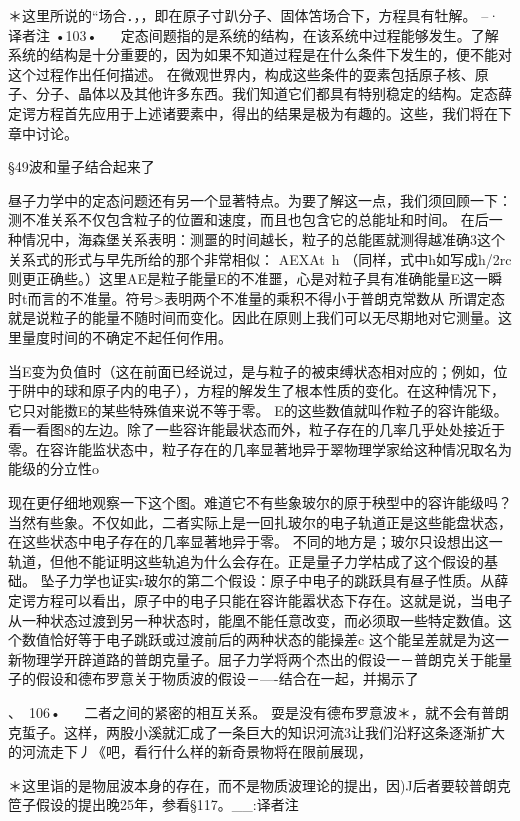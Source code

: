 ＊这里所说的“场合．，，即在原子寸趴分子、固体笘场合下，方程具有牡解。
--·译者注
•103•
  
定态间题指的是系统的结构，在该系统中过程能够发生。了解系统的结构是十分重要的，因为如果不知道过程是在什么条件下发生的，便不能对这个过程作出任何描述。
在微观世界内，构成这些条件的耍素包括原子核、原子、分子、晶体以及其他许多东西。我们知道它们都具有特别稳定的结构。定态薛定谔方程首先应用于上述诸要素中，得出的结果是极为有趣的。这些，我们将在下章中讨论。

§49波和量子结合起来了

昼子力学中的定态问题还有另一个显著特点。为要了解这一点，我们须回顾一下：测不准关系不仅包含粒子的位置和速度，而且也包含它的总能址和时间。
在后一种情况中，海森堡关系表明：测噩的时间越长，粒子的总能匿就测得越准确3这个关系式的形式与早先所给的那个非常相似：
AEXAt~h
（同样，式中h如写成h/2rc则更正确些。）这里AE是粒子能量E的不准噩，心是对粒子具有准确能量E这一瞬时t而言的不准量。符号>表明两个不准量的乘积不得小于普朗克常数从
所谓定态就是说粒子的能量不随时间而变化。因此在原则上我们可以无尽期地对它测量。这里量度时间的不确定不起任何作用。

当E变为负值时（这在前面已经说过，是与粒子的被束缚状态相对应的；例如，位于阱中的球和原子内的电子），方程的解发生了根本性质的变化。在这种情况下，它只对能擞E的某些特殊值来说不等于零。
E的这些数值就叫作粒子的容许能级。看一看图8的左边。除了一些容许能最状态而外，粒子存在的几率几乎处处接近于零。在容许能监状态中，粒子存在的几率显著地异于翠物理学家给这种情况取名为能级的分立性o

现在更仔细地观察一下这个图。难道它不有些象玻尔的原于秧型中的容许能级吗？当然有些象。不仅如此，二者实际上是一回扎玻尔的电子轨道正是这些能盘状态，在这些状态中电子存在的几率显著地异于零。
不同的地方是；玻尔只设想出这一轨道，但他不能证明这些轨追为什么会存在。正是量子力学枯成了这个假设的基础。
坠子力学也证实r玻尔的第二个假设：原子中电子的跳跃具有昼子性质。从薛定谔方程可以看出，原子中的电子只能在容许能嚣状态下存在。这就是说，当电子从一种状态过渡到另一种状态时，能凰不能任意改变，而必须取一些特定数值。这个数值恰好等于电子跳跃或过渡前后的两种状态的能操差c
这个能呈差就是为这一新物理学开辟道路的普朗克量子。屈子力学将两个杰出的假设一－普朗克关于能量子的假设和德布罗意关于物质波的假设－—-结合在一起，并揭示了

、~106•
  
二者之间的紧密的相互关系。
耍是没有德布罗意波＊，就不会有普朗克蜇子。这样，两股小溪就汇成了一条巨大的知识河流3让我们沿籽这条逐渐扩大的河流走下丿《吧，看行什么样的新奇景物将在限前展现，

＊这里诣的是物屈波本身的存在，而不是物质波理论的提出，因)J后者要较普朗克笸子假设的提出晚25年，参看§117。__:译者注

